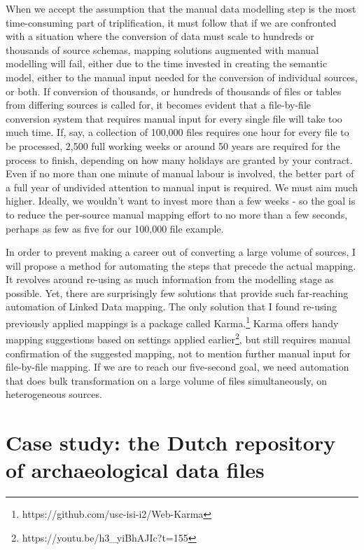 \documentclass[12pt,twoside,a4paper]{article}
\begin{document}
When we accept the assumption that the manual data modelling step is the most time-consuming part of triplification, it must follow that if we are confronted with a situation where the conversion of data must scale to hundreds or thousands of source schemas, mapping solutions augmented with manual modelling will fail, either due to the time invested in creating the semantic model, either to the manual input needed for the conversion of individual sources, or both. If conversion of thousands, or hundreds of thousands of files or tables from differing sources is called for, it becomes evident that a file-by-file conversion system that requires manual input for every single file will take too much time. If, say, a collection of 100,000 files requires one hour for every file to be processed, 2,500 full working weeks or around 50 years are required for the process to finish, depending on how many holidays are granted by your contract. Even if no more than one minute of manual labour is involved, the better part of a full year of undivided attention to manual input is required. We must aim much higher. Ideally, we wouldn't want to invest more than a few weeks - so the goal is to reduce the per-source manual mapping effort to no more than a few seconds, perhaps as few as five for our 100,000 file example.  

In order to prevent making a career out of converting a large volume of sources, I will propose a method for automating the steps that precede the actual mapping. It revolves around re-using as much information from the modelling stage as possible. Yet, there are surprisingly few solutions that provide such far-reaching automation of Linked Data mapping. The only solution that I found re-using previously applied mappings is a package called Karma.\footnote{https://github.com/usc-isi-i2/Web-Karma} Karma offers handy mapping suggestions based on settings applied earlier\footnote{https://youtu.be/h3\_yiBhAJIc?t=155}, but still requires manual confirmation of the suggested mapping, not to mention further manual input for file-by-file mapping. If we are to reach our five-second goal, we need automation that does bulk transformation on a large volume of files simultaneously, on heterogeneous sources.
\section{Case study: the Dutch repository of archaeological data files}
\end{document}
